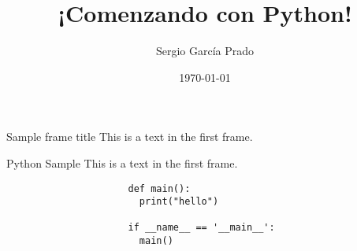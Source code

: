 \documentclass{beamer}
\title{¡Comenzando con Python!}
\author{Sergio García Prado}
\date{\today}
\begin{document}
    \begin{frame}
        \titlepage
    \end{frame}

    \begin{frame}{Sample frame title}
        This is a text in the first frame.
    \end{frame}

    \begin{frame}[fragile]{Python Sample}
        This is a text in the first frame.
        \begin{figure}
            \begin{verbatim}
                def main():
                  print("hello")

                if __name__ == '__main__':
                  main()
            \end{verbatim}
        \end{figure}

    \end{frame}
\end{document}
